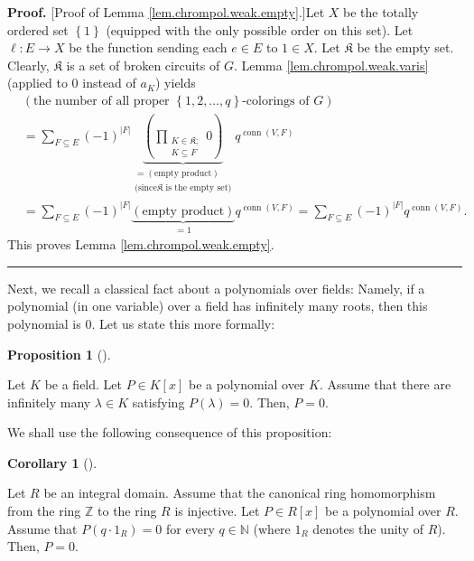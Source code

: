 \documentclass[numbers=enddot,12pt,final,onecolumn,notitlepage]{scrartcl}%
\theoremstyle{definition}
\newtheorem{prop}[theo]{Proposition}
\newenvironment{proposition}[1][]
{\begin{prop}[#1]\begin{leftbar}}
{\end{leftbar}\end{prop}}
\newtheorem{coro}[theo]{Corollary}
\newenvironment{corollary}[1][]
{\begin{coro}[#1]\begin{leftbar}}
{\end{leftbar}\end{coro}}
\newenvironment{proof}[1][Proof]{\noindent\textbf{#1.} }{\ \rule{0.5em}{0.5em}}
\newenvironment{verlong}{}{}
\let\sumnonlimits\sum
\let\prodnonlimits\prod
\renewcommand{\sum}{\sumnonlimits\limits}
\renewcommand{\prod}{\prodnonlimits\limits}
\begin{document}
\begin{verlong}
\begin{proof}
[Proof of Lemma \ref{lem.chrompol.weak.empty}.]Let $X$ be the totally ordered
set $\left\{  1\right\}  $ (equipped with the only possible order on this
set). Let $\ell:E\rightarrow X$ be the function sending each $e\in E$ to $1\in
X$. Let $\mathfrak{K}$ be the empty set. Clearly, $\mathfrak{K}$ is a set of
broken circuits of $G$. Lemma \ref{lem.chrompol.weak.varis} (applied to $0$
instead of $a_{K}$) yields%
\begin{align*}
&  \left(  \text{the number of all proper }\left\{  1,2,\ldots,q\right\}
\text{-colorings of }G\right) \\
&  =\sum_{F\subseteq E}\left(  -1\right)  ^{\left\vert F\right\vert
}\underbrace{\left(  \prod_{\substack{K\in\mathfrak{K};\\K\subseteq
F}}0\right)  }_{\substack{=\left(  \text{empty product}\right)  \\\text{(since
}\mathfrak{K}\text{ is the empty set)}}}q^{\operatorname*{conn}\left(
V,F\right)  }\\
&  =\sum_{F\subseteq E}\left(  -1\right)  ^{\left\vert F\right\vert
}\underbrace{\left(  \text{empty product}\right)  }_{=1}%
q^{\operatorname*{conn}\left(  V,F\right)  }=\sum_{F\subseteq E}\left(
-1\right)  ^{\left\vert F\right\vert }q^{\operatorname*{conn}\left(
V,F\right)  }.
\end{align*}
This proves Lemma \ref{lem.chrompol.weak.empty}.
\end{proof}
\end{verlong}

Next, we recall a classical fact about a polynomials over fields: Namely, if a
polynomial (in one variable) over a field has infinitely many roots, then this
polynomial is $0$. Let us state this more formally:

\begin{proposition}
\label{prop.poly0.field}Let $K$ be a field. Let $P\in K\left[  x\right]  $ be
a polynomial over $K$. Assume that there are infinitely many $\lambda\in K$
satisfying $P\left(  \lambda\right)  =0$. Then, $P=0$.
\end{proposition}

We shall use the following consequence of this proposition:

\begin{corollary}
\label{cor.poly0.intdom}Let $R$ be an integral domain. Assume that the
canonical ring homomorphism from the ring $\mathbb{Z}$ to the ring $R$ is
injective. Let $P\in R\left[  x\right]  $ be a polynomial over $R$. Assume
that $P\left(  q\cdot1_{R}\right)  =0$ for every $q\in\mathbb{N}$ (where
$1_{R}$ denotes the unity of $R$). Then, $P=0$.
\end{corollary}
\end{document}
